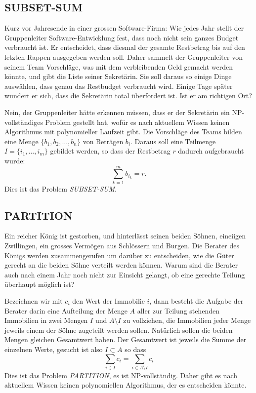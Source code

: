 \subsection{SUBSET-SUM}
Kurz vor Jahresende in einer grossen Software-Firma: Wie jedes Jahr stellt
der Gruppenleiter Software-Entwicklung fest, dass noch nicht sein ganzes
Budget verbraucht ist.
Er entscheidet, dass diesmal der gesamte Restbetrag
bis auf den letzten Rappen
ausgegeben werden soll.
Daher sammelt der Gruppenleiter von seinem
Team Vorschläge, was mit dem verbleibenden Geld gemacht werden könnte,
und gibt die Liste seiner Sekretärin.
Sie soll daraus so einige Dinge
auswählen, dass genau das Restbudget verbraucht wird.
Einige Tage später
wundert er sich, dass die Sekretärin total überfordert ist.
Ist er
am richtigen Ort?

\medskip

Nein, der Gruppenleiter hätte erkennen müssen, dass er der Sekretärin
ein NP-vollständiges Problem gestellt hat, wofür es nach aktuellem
Wissen keinen Algorithmus mit polynomieller Laufzeit gibt.
Die Vorschläge
des Teams bilden eine Menge $\{b_1,b_2,\dots,b_n\}$ von Beträgen $b_i$.
Daraus soll eine Teilmenge $I=\{i_1,\dots,i_m\}$ gebildet werden, so dass
der Restbetrag $r$ dadurch aufgebraucht wurde:
\[
\sum_{k=1}^m b_{i_k} = r.
\]
Dies ist das Problem {\it SUBSET-SUM}.

\subsection{PARTITION}
Ein reicher König ist gestorben, und hinterlässt seinen beiden
Söhnen, eineiigen Zwillingen, ein grosses Vermögen aus Schlössern
und Burgen.
Die Berater des Königs werden zusammengerufen um
darüber zu entscheiden, wie die Güter gerecht an die beiden Söhne
verteilt werden können.
Warum sind die Berater auch nach einem Jahr
noch nicht zur Einsicht gelangt, ob eine gerechte Teilung überhaupt
möglich ist?

Bezeichnen wir mit $c_i$ den Wert der Immobilie $i$, dann besteht
die Aufgabe der Berater darin eine Aufteilung der Menge $A$ aller 
zur Teilung stehenden Immobilien in zwei Mengen $I$ und $A\setminus I$
zu vollziehen, die Immobilien jeder Menge jeweils einem der Söhne zugeteilt
werden sollen.
Natürlich sollen die beiden Mengen gleichen Gesamtwert haben.
Der Gesamtwert ist jeweils die Summe der einzelnen Werte, gesucht ist also
$I\subset A$ so dass
\[
\sum_{i\in I}c_i =\sum_{i\in A\setminus I}c_i
\]
Dies ist das Problem {\it PARTITION}, es ist NP-vollständig.
Daher gibt es nach aktuellem Wissen keinen polynomiellen Algorithmus,
der es entscheiden könnte.


